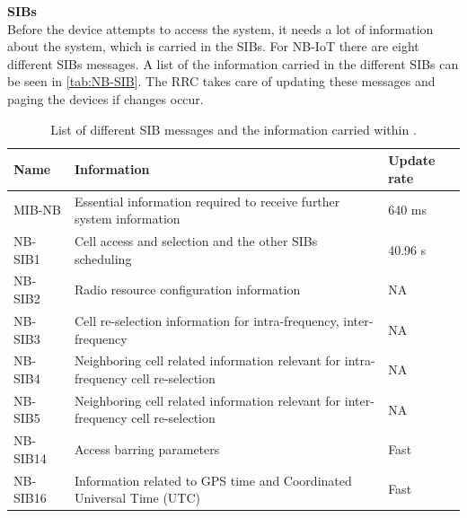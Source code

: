 \textbf{\gls{SIB}s}\\
Before the device attempts to access the system, it needs a lot of information about the system, which is carried in the \gls{SIB}s. For \gls{NB-IoT} there are eight different \gls{SIB}s messages. A list of the information carried in the different \gls{SIB}s can be seen in \autoref{tab:NB-SIB}. The \gls{RRC} takes care of updating these messages and paging the devices if changes occur.

\begin{table}[H]
\centering
\begin{tabular}{|p{3cm}|p{8cm}|p{3cm}|}\hline
\textbf{Name}        & \textbf{Information}                                                                    & \textbf{Update rate}    \\\hline
\raggedright\arraybackslash\gls{MIB-NB}        & Essential information required to receive further system information                     & 640 ms                \\\hline
\raggedright\arraybackslash\gls{NB-SIB}1        & Cell access and selection and the other SIBs scheduling                                         & 40.96 s                 \\\hline
\gls{NB-SIB}2        & Radio resource configuration information                                                 & NA                     \\\hline
\gls{NB-SIB}3        & Cell re-selection information for intra-frequency, inter-frequency                     & NA                     \\\hline
\gls{NB-SIB}4        & Neighboring cell related information relevant for intra-frequency cell re-selection     & NA                     \\\hline
\gls{NB-SIB}5        & Neighboring cell related information relevant for inter-frequency cell re-selection     & NA                     \\\hline
\gls{NB-SIB}14        & Access barring parameters                                                             & Fast                     \\\hline
\gls{NB-SIB}16        & Information related to GPS time and Coordinated Universal Time (UTC)                     & Fast                     \\\hline
\end{tabular}
\caption{List of different \gls{SIB} messages and the information carried within \citep{whitepaper,REL-13}.}
\label{tab:NB-SIB}
\end{table}

